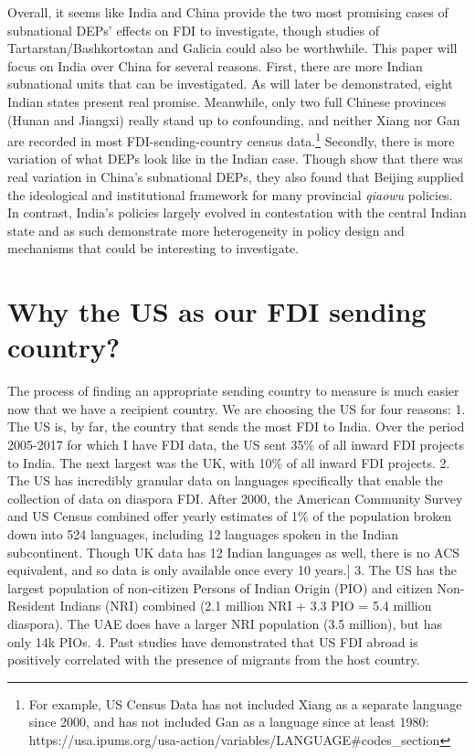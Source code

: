 \documentclass[doublespace,nopageskip]{UVAthesis}
\begin{document}
    Overall, it seems like India and China provide the two most promising cases of subnational DEPs' effects on FDI to investigate, though studies of Tartarstan/Bashkortostan and Galicia could also be worthwhile. This paper will focus on India over China for several reasons. First, there are more Indian subnational units that can be investigated. As will later be demonstrated, eight Indian states present real promise. Meanwhile, only two full Chinese provinces (Hunan and Jiangxi) really stand up to confounding, and neither Xiang nor Gan are recorded in most FDI-sending-country census data.\footnote{For example, US Census Data has not included Xiang as a separate language since 2000, and has not included Gan as a language since at least 1980: https://usa.ipums.org/usa-action/variables/LANGUAGE\#codes\_section} Secondly, there is more variation of what DEPs look like in the Indian case. Though \citeauthor{liu_chinas_2016} show that there was real variation in China's subnational DEPs, they also found that Beijing supplied the ideological and institutional framework for many provincial \textit{qiaowu} policies. In contrast, India's policies largely evolved in contestation with the central Indian state \citep{sharma_partisan_2020} and as such demonstrate more heterogeneity in policy design and mechanisms that could be interesting to investigate.

\section{Why the US as our FDI sending country?} \label{ss:why the us?}
    The process of finding an appropriate sending country to measure is much easier now that we have a recipient country. We are choosing the US for four reasons:
    1. The US is, by far, the country that sends the most FDI to India. Over the period 2005-2017 for which I have FDI data, the US sent 35\% of all inward FDI projects to India. The next largest was the UK, with 10\% of all inward FDI projects.
    2. The US has incredibly granular data on languages specifically that enable the collection of data on diaspora FDI. After 2000, the American Community Survey and US Census combined offer yearly estimates of 1\% of the population broken down into 524 languages, including 12 languages spoken in the Indian subcontinent. \citep{noauthor_ipums_nodate} Though UK data has 12 Indian languages as well, there is no ACS equivalent, and so data is only available once every 10 years.\citet{service_language_nodate}]
    3. The US has the largest population of non-citizen Persons of Indian Origin (PIO) and citizen Non-Resident Indians (NRI) combined (2.1 million NRI + 3.3 PIO = 5.4 million diaspora). The UAE does have a larger NRI population (3.5 million), but has only 14k PIOs.\citet{noauthor_population_nodate}
    4. Past studies have demonstrated that US FDI abroad is positively correlated with the presence of migrants from the host country. \citet{javorcik_migrant_2011}
  
\end{document}
